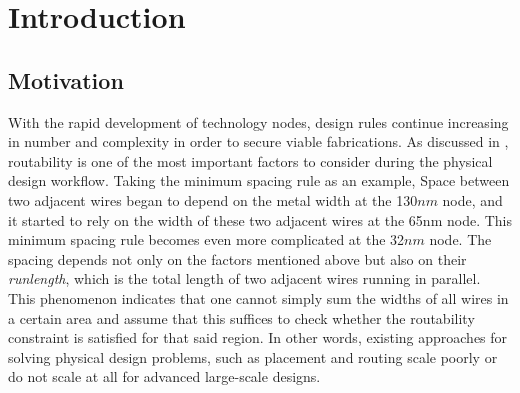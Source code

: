 \section{Introduction}
\label{sec:intro}
\subsection{Motivation}
With the rapid development of technology nodes, design rules continue increasing in number and complexity in order to secure viable fabrications.
As discussed in \cite{theimportance}, routability is one of the most important factors to consider during the physical design workflow.  Taking the minimum spacing rule as an example, Space between two adjacent wires began to depend on the metal width at the 130$nm$ node, and it started to rely on the width of these two adjacent wires at the 65nm node.
This minimum spacing rule becomes even more complicated at the 32$nm$ node.
The spacing depends not only on the factors mentioned above but also on their \textit{runlength}, which is the total length of two adjacent wires running in parallel.
This phenomenon indicates that one cannot simply sum the widths of all wires in a certain area and assume that this suffices to check whether the routability constraint is satisfied for that said region.
In other words, existing approaches for solving physical design problems, such as placement and routing scale poorly or do not scale at all for advanced large-scale designs.


